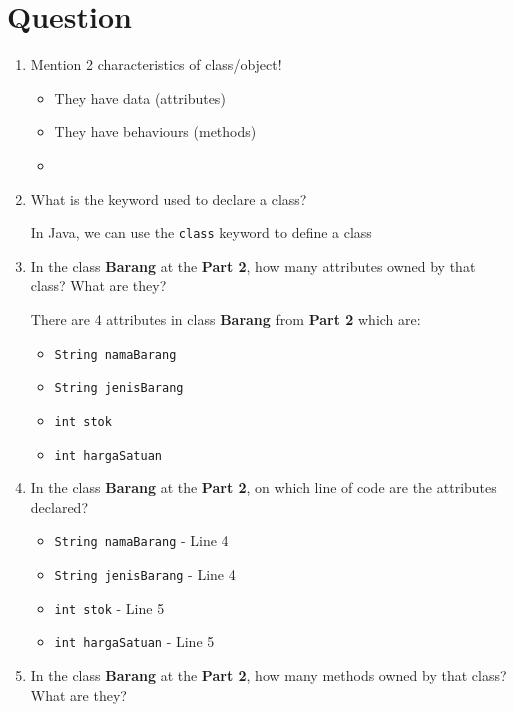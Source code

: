 \documentclass[12pt,titlepage]{article}
\begin{document}
\section{Question}
\begin{enumerate}
    \item {
        Mention 2 characteristics of class/object!

        \begin{itemize}
            \item They have data (attributes)
            \item They have behaviours (methods)
            \item 
        \end{itemize}
    }
    \item {
        What is the keyword used to declare a class?

        In Java, we can use the \texttt{class} keyword to define a class
    }
    \item {
        In the class \textbf{Barang} at the \textbf{Part 2}, how many attributes owned by that class? What are they?

        There are 4 attributes in class \textbf{Barang} from \textbf{Part 2} which are:
        \begin{itemize}
            \item \texttt{String namaBarang}
            \item \texttt{String jenisBarang}
            \item \texttt{int stok}
            \item \texttt{int hargaSatuan}
        \end{itemize}
    }
    \item {
        In the class \textbf{Barang} at the \textbf{Part 2}, on which line of code are the attributes declared?

        \begin{itemize}
            \item \texttt{String namaBarang} - Line 4
            \item \texttt{String jenisBarang} - Line 4
            \item \texttt{int stok} - Line 5
            \item \texttt{int hargaSatuan} - Line 5
        \end{itemize}
    }
    \item {
        In the class \textbf{Barang} at the \textbf{Part 2}, how many methods owned by that class? What are they?

}
\end{enumerate}
\end{document}

